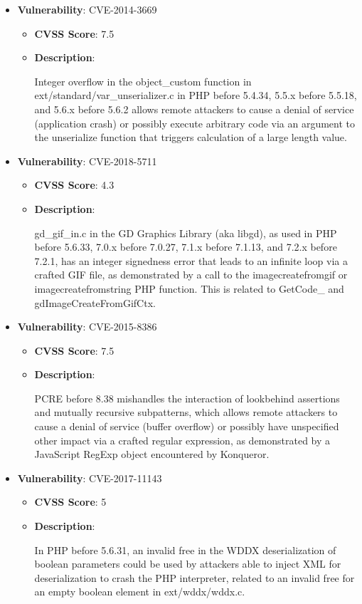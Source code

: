 \documentclass{article}
\begin{document}
\begin{itemize}
        \item \textbf{Vulnerability}: CVE-2014-3669
        \begin{itemize}
            \item \textbf{CVSS Score}:  7.5 
            \item \textbf{Description}:
            \parbox[t]{0.9\linewidth}{
                \ttfamily Integer overflow in the object\_custom function in ext/standard/var\_unserializer.c in PHP before 5.4.34, 5.5.x before 5.5.18, and 5.6.x before 5.6.2 allows remote attackers to cause a denial of service (application crash) or possibly execute arbitrary code via an argument to the unserialize function that triggers calculation of a large length value.
            }
        \end{itemize}
    
        \item \textbf{Vulnerability}: CVE-2018-5711
        \begin{itemize}
            \item \textbf{CVSS Score}:  4.3 
            \item \textbf{Description}:
            \parbox[t]{0.9\linewidth}{
                \ttfamily gd\_gif\_in.c in the GD Graphics Library (aka libgd), as used in PHP before 5.6.33, 7.0.x before 7.0.27, 7.1.x before 7.1.13, and 7.2.x before 7.2.1, has an integer signedness error that leads to an infinite loop via a crafted GIF file, as demonstrated by a call to the imagecreatefromgif or imagecreatefromstring PHP function. This is related to GetCode\_ and gdImageCreateFromGifCtx.
            }
        \end{itemize}
    
        \item \textbf{Vulnerability}: CVE-2015-8386
        \begin{itemize}
            \item \textbf{CVSS Score}:  7.5 
            \item \textbf{Description}:
            \parbox[t]{0.9\linewidth}{
                \ttfamily PCRE before 8.38 mishandles the interaction of lookbehind assertions and mutually recursive subpatterns, which allows remote attackers to cause a denial of service (buffer overflow) or possibly have unspecified other impact via a crafted regular expression, as demonstrated by a JavaScript RegExp object encountered by Konqueror.
            }
        \end{itemize}
    
        \item \textbf{Vulnerability}: CVE-2017-11143
        \begin{itemize}
            \item \textbf{CVSS Score}:  5 
            \item \textbf{Description}:
            \parbox[t]{0.9\linewidth}{
                \ttfamily In PHP before 5.6.31, an invalid free in the WDDX deserialization of boolean parameters could be used by attackers able to inject XML for deserialization to crash the PHP interpreter, related to an invalid free for an empty boolean element in ext/wddx/wddx.c.
            }
        \end{itemize}
    

\end{itemize}
\end{document}
